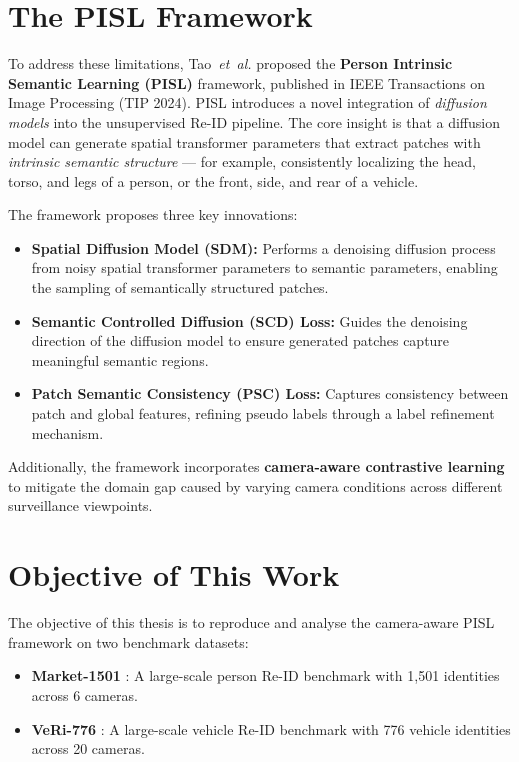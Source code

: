 \section{The PISL Framework}

To address these limitations, Tao~\textit{et~al.} \cite{tao2024unsupervised} proposed the \textbf{Person Intrinsic Semantic Learning (PISL)} framework, published in IEEE Transactions on Image Processing (TIP 2024). PISL introduces a novel integration of \textit{diffusion models} into the unsupervised Re-ID pipeline. The core insight is that a diffusion model can generate spatial transformer parameters that extract patches with \textit{intrinsic semantic structure} --- for example, consistently localizing the head, torso, and legs of a person, or the front, side, and rear of a vehicle.

The framework proposes three key innovations:
\begin{itemize}
    \item \textbf{Spatial Diffusion Model (SDM):} Performs a denoising diffusion process from noisy spatial transformer parameters to semantic parameters, enabling the sampling of semantically structured patches.
    \item \textbf{Semantic Controlled Diffusion (SCD) Loss:} Guides the denoising direction of the diffusion model to ensure generated patches capture meaningful semantic regions.
    \item \textbf{Patch Semantic Consistency (PSC) Loss:} Captures consistency between patch and global features, refining pseudo labels through a label refinement mechanism.
\end{itemize}

Additionally, the framework incorporates \textbf{camera-aware contrastive learning} \cite{wang2021cap} to mitigate the domain gap caused by varying camera conditions across different surveillance viewpoints.

\section{Objective of This Work}

The objective of this thesis is to reproduce and analyse the camera-aware PISL framework on two benchmark datasets:
\begin{itemize}
    \item \textbf{Market-1501} \cite{zheng2015scalable}: A large-scale person Re-ID benchmark with 1,501 identities across 6 cameras.
    \item \textbf{VeRi-776} \cite{liu2016deepveri}: A large-scale vehicle Re-ID benchmark with 776 vehicle identities across 20 cameras.
\end{itemize}

